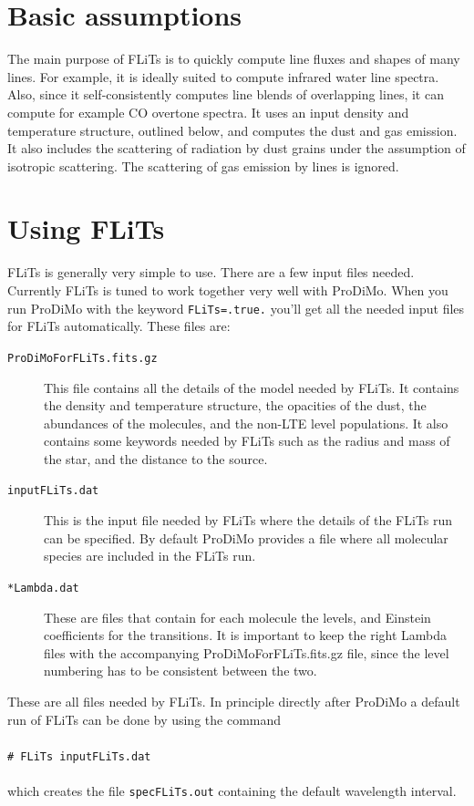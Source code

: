 \documentclass[12pt]{article}
\newcommand{\shellcmd}[1]{\\ \\ \indent\indent\texttt{\# #1}\\ \\ }
\begin{document}
\section{Basic assumptions}

The main purpose of FLiTs is to quickly compute line fluxes and shapes of many lines. For example, it is ideally suited to compute infrared water line spectra. Also, since it self-consistently computes line blends of overlapping lines, it can compute for example CO overtone spectra. It uses an input density and temperature structure, outlined below, and computes the dust and gas emission. It also includes the scattering of radiation by dust grains under the assumption of isotropic scattering. The scattering of gas emission by lines is ignored.

\section{Using FLiTs}

FLiTs is generally very simple to use. There are a few input files needed. Currently FLiTs is tuned to work together very well with ProDiMo.
When you run ProDiMo with the keyword \texttt{FLiTs=.true.} you'll get all the needed input files for FLiTs automatically. These files are:
\begin{description}
\item[\texttt{ProDiMoForFLiTs.fits.gz}] This file contains all the details of the model needed by FLiTs. It contains the density and temperature structure, the opacities of the dust, the abundances of the molecules, and the non-LTE level populations. It also contains some keywords needed by FLiTs such as the radius and mass of the star, and the distance to the source.
\item[\texttt{inputFLiTs.dat}] This is the input file needed by FLiTs where the details of the FLiTs run can be specified. By default ProDiMo provides a file where all molecular species are included in the FLiTs run.
\item[\texttt{*Lambda.dat}] These are files that contain for each molecule the levels, and Einstein coefficients for the transitions. It is important to keep the right Lambda files with the accompanying ProDiMoForFLiTs.fits.gz file, since the level numbering has to be consistent between the two.
\end{description}

These are all files needed by FLiTs. In principle directly after ProDiMo a default run of FLiTs can be done by using the command
%
\shellcmd{FLiTs inputFLiTs.dat}
%
which creates the file \texttt{specFLiTs.out} containing the default wavelength interval.
\end{document}
